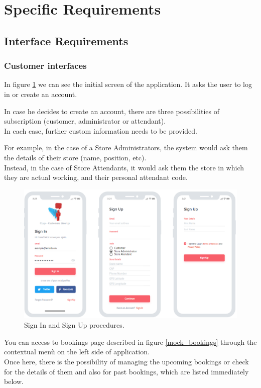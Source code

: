 \documentclass[table, 12pt]{article}
\begin{document}
\newpage
\section{Specific Requirements}
\subsection{Interface Requirements}
\subsubsection{Customer interfaces}
In figure \ref{mock_sign_in_up} we can see the initial screen of the application.
It asks the user to log in or create an account.

In case he decides to create an account, there are three possibilities of subscription (customer, administrator or attendant).\\
In each case, further custom information needs to be provided.

For example, in the case of a Store Administrators, the system would ask them the details of their store (name, position, etc).\\
Instead, in the case of Store Attendants, it would ask them the store in which they are actual working, and their personal attendant code.
\begin{figure}[H]
    \begin{center}
        \includegraphics[width=\textwidth]{assets/mock_sign_in_sign_up.png}
        \caption{Sign In and Sign Up procedures.}
        \label{mock_sign_in_up}
    \end{center}
\end{figure}

You can access to bookings page described in figure \ref{mock_bookings} through the contextual menù on the left side of application.\\
Once here, there is the possibility of managing the upcoming bookings or check for the details of them and also for past bookings, which are listed immediately below.
\end{document}
